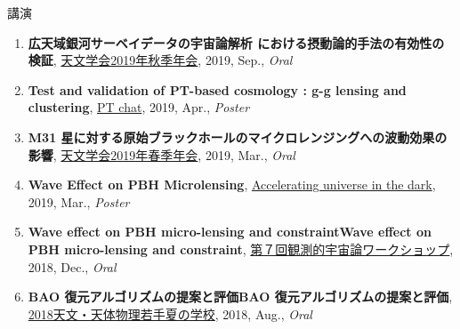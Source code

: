 \begin{rSection}{講演}
\begin{enumerate}
\item \textbf{広天域銀河サーベイデータの宇宙論解析 における摂動論的手法の有効性の検証}, \href{https://www.asj.or.jp/nenkai/archive/2019b/pdf/U20a.pdf}{天文学会2019年秋季年会}, 2019, Sep., \textit{Oral}
\item \textbf{Test and validation of PT-based cosmology : g-g lensing and clustering}, \href{http://pt-chat-kyoto.sciencesconf.org/}{PT chat}, 2019, Apr., \textit{Poster}
\item \textbf{M31 星に対する原始ブラックホールのマイクロレンジングへの波動効果の影響}, \href{https://www.asj.or.jp/nenkai/archive/2019a/pdf/U14a.pdf}{天文学会2019年春季年会}, 2019, Mar., \textit{Oral}
\item \textbf{Wave Effect on PBH Microlensing}, \href{http://www2.yukawa.kyoto-u.ac.jp/~aud2019/index.php}{Accelerating universe in the dark}, 2019, Mar., \textit{Poster}
\item \textbf{Wave effect on PBH micro-lensing and constraintWave effect on PBH micro-lensing and constraint}, \href{http://web.cc.yamaguchi-u.ac.jp/~rsaito/obscosmo2018/}{第７回観測的宇宙論ワークショップ}, 2018, Dec., \textit{Oral}
\item \textbf{BAO 復元アルゴリズムの提案と評価BAO 復元アルゴリズムの提案と評価}, \href{http://www.astro-wakate.org/ss2018/web/link.html}{2018天文・天体物理若手夏の学校}, 2018, Aug., \textit{Oral}
\end{enumerate}\end{rSection}
